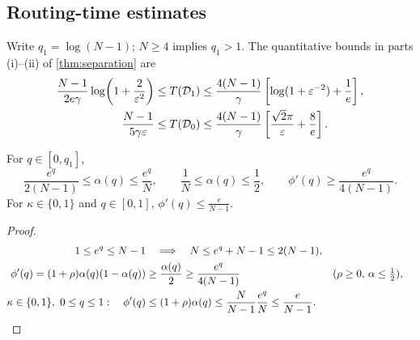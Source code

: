 \subsection{Routing-time estimates}
\label{app:routing-proof}
Write $q_1=\log(N-1)$; $N\ge4$ implies $q_1>1$.
The quantitative bounds in parts (i)--(ii) of \cref{thm:separation} are
\begin{align*}
 \frac{N-1}{2e\gamma}\log\!\left(1+\frac{2}{\varepsilon^2}\right)
 &\le\Tr(\Dlaw1)\le\frac{4(N-1)}{\gamma}\left[\log(1+\varepsilon^{-2})+\frac{1}{e}\right],\\
 \frac{N-1}{5\gamma \varepsilon}
 &\le\Tr(\Dlaw0)\le\frac{4(N-1)}{\gamma}\left[\frac{\sqrt2\pi}{\varepsilon}+\frac{8}{e}\right].
\end{align*}

\begin{lemma}
\label{lem:attention-bounds}
For $q\in[0,q_1]$,
\begin{equation}
 \frac{e^q}{2(N-1)}\le \alpha(q)\le\frac{e^q}{N},\qquad
 \frac{1}{N}\le \alpha(q)\le\frac{1}{2},\qquad
 \phi'(q)\ge\frac{e^q}{4(N-1)}.
 \label{eq:alpha-bounds}
\end{equation}
For $\kappa\in\{0,1\}$ and $q\in[0,1]$, $\phi'(q)\le \tfrac{e}{N-1}$.
\end{lemma}
\begin{proof}
\begin{align*}
 1\le e^q\le N-1
 &\quad\Longrightarrow\quad
 N\le e^q+N-1\le2(N-1),\\
 \phi'(q)=(1+\rho)\alpha(q)(1-\alpha(q))
 &\ge\frac{\alpha(q)}{2}\ge\frac{e^q}{4(N-1)}&&\text{($\rho\ge0$, $\alpha\le\tfrac12$)},\\
 \kappa\in\{0,1\},\ 0\le q\le1:\quad
 \phi'(q)&\le(1+\rho)\alpha(q)
 \le\frac{N}{N-1}\frac{e^q}{N}\le\frac{e}{N-1}.\qedhere
\end{align*}
\end{proof}

